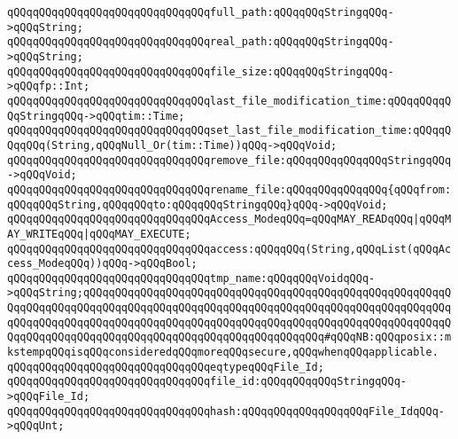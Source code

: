 \newline
\verb|qQQqqQQqqQQqqQQqqQQqqQQqqQQqqQQqfull_path:qQQqqQQqStringqQQq->qQQqString;|\newline
\verb|qQQqqQQqqQQqqQQqqQQqqQQqqQQqqQQqreal_path:qQQqqQQqStringqQQq->qQQqString;|\newline
\newline
\verb|qQQqqQQqqQQqqQQqqQQqqQQqqQQqqQQqfile_size:qQQqqQQqStringqQQq->qQQqfp::Int;|\newline
\newline
\verb|qQQqqQQqqQQqqQQqqQQqqQQqqQQqqQQqlast_file_modification_time:qQQqqQQqqQQqStringqQQq->qQQqtim::Time;|\newline
\verb|qQQqqQQqqQQqqQQqqQQqqQQqqQQqqQQqset_last_file_modification_time:qQQqqQQqqQQq(String,qQQqNull_Or(tim::Time))qQQq->qQQqVoid;|\newline
\newline
\verb|qQQqqQQqqQQqqQQqqQQqqQQqqQQqqQQqremove_file:qQQqqQQqqQQqqQQqStringqQQq->qQQqVoid;|\newline
\verb|qQQqqQQqqQQqqQQqqQQqqQQqqQQqqQQqrename_file:qQQqqQQqqQQqqQQq{qQQqfrom:qQQqqQQqString,qQQqqQQqto:qQQqqQQqStringqQQq}qQQq->qQQqVoid;|\newline
\newline
\verb|qQQqqQQqqQQqqQQqqQQqqQQqqQQqqQQqAccess_ModeqQQq=qQQqMAY_READqQQq|\verb#|qQQqMAY_WRITEqQQq|qQQqMAY_EXECUTE;#\newline
\newline
\verb|qQQqqQQqqQQqqQQqqQQqqQQqqQQqqQQqaccess:qQQqqQQq(String,qQQqList(qQQqAccess_ModeqQQq))qQQq->qQQqBool;|\newline
\newline
\verb|qQQqqQQqqQQqqQQqqQQqqQQqqQQqqQQqtmp_name:qQQqqQQqVoidqQQq->qQQqString;qQQqqQQqqQQqqQQqqQQqqQQqqQQqqQQqqQQqqQQqqQQqqQQqqQQqqQQqqQQqqQQqqQQqqQQqqQQqqQQqqQQqqQQqqQQqqQQqqQQqqQQqqQQqqQQqqQQqqQQqqQQqqQQqqQQqqQQqqQQqqQQqqQQqqQQqqQQqqQQqqQQqqQQqqQQqqQQqqQQqqQQqqQQqqQQqqQQqqQQqqQQqqQQqqQQqqQQqqQQqqQQqqQQqqQQqqQQqqQQqqQQqqQQq#qQQqNB:qQQqposix::mkstempqQQqisqQQqconsideredqQQqmoreqQQqsecure,qQQqwhenqQQqapplicable.|\newline
\newline
\verb|qQQqqQQqqQQqqQQqqQQqqQQqqQQqqQQqeqtypeqQQqFile_Id;|\newline
\newline
\verb|qQQqqQQqqQQqqQQqqQQqqQQqqQQqqQQqfile_id:qQQqqQQqqQQqStringqQQq->qQQqFile_Id;|\newline
\verb|qQQqqQQqqQQqqQQqqQQqqQQqqQQqqQQqhash:qQQqqQQqqQQqqQQqqQQqFile_IdqQQq->qQQqUnt;|\newline
